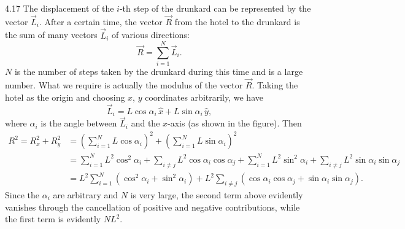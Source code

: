 \begin{solution}{4.17}
The displacement of the $i$-th step of the drunkard can be represented by the vector
$\vec{L}_i$. After a certain time, the vector $\vec{R}$ from the hotel to the drunkard is the sum
of many vectors $\vec{L}_i$ of various directions:
\begin{equation*}
\vec{R} = \sum_{i=1}^{N}\vec{L}_i .
\end{equation*}
$N$ is the number of steps taken by the drunkard during this time and is a large number. What we
require is actually the modulus of the vector $\vec{R}$. Taking the hotel as the origin and
choosing $x$, $y$ coordinates arbitrarily, we have
\begin{equation*}
\vec{L}_i = L\cos\alpha_i\,\hat{x} + L\sin\alpha_i\,\hat{y},
\end{equation*}
where $\alpha_i$ is the angle between $\vec{L}_i$ and the $x$-axis (as shown in the figure).
Then
\begin{align*}
R^2 = R_x^2+R_y^2
&= \left(\sum_{i=1}^{N}L\cos\alpha_i\right)^2
 + \left(\sum_{i=1}^{N}L\sin\alpha_i\right)^2\\
&= \sum_{i=1}^{N}L^2\cos^2\alpha_i + \sum_{i\neq j}L^2\cos\alpha_i\cos\alpha_j
 + \sum_{i=1}^{N}L^2\sin^2\alpha_i + \sum_{i\neq j}L^2\sin\alpha_i\sin\alpha_j\\
&= L^2\sum_{i=1}^{N}\left(\cos^2\alpha_i+\sin^2\alpha_i\right)
 + L^2\sum_{i\neq j}\left(\cos\alpha_i\cos\alpha_j+\sin\alpha_i\sin\alpha_j\right).
\end{align*}
Since the $\alpha_i$ are arbitrary and $N$ is very large, the second term above evidently
vanishes through the cancellation of positive and negative contributions, while the first term
is evidently $NL^2$.


\end{solution}
